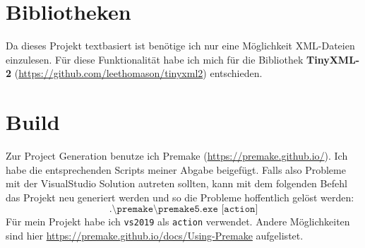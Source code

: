 \documentclass[a4paper,12pt]{article}
\begin{document}
\section*{Bibliotheken}

Da dieses Projekt textbasiert ist benötige ich nur eine Möglichkeit XML-Dateien einzulesen. Für diese Funktionalität habe ich mich für die Bibliothek \textbf{TinyXML-2} (\url{https://github.com/leethomason/tinyxml2}) entschieden.
 

\section*{Build}

Zur Project Generation benutze ich Premake (\url{https://premake.github.io/}). Ich habe die entsprechenden Scripts meiner Abgabe beigefügt.
Falls also Probleme mit der VisualStudio Solution autreten sollten,
kann mit dem folgenden Befehl das Projekt neu generiert werden und so die Probleme hoffentlich gelöst werden:
\[\texttt{.\textbackslash premake\textbackslash premake5.exe [action]}\]
Für mein Projekt habe ich \texttt{vs2019} als \texttt{action} verwendet. Andere Möglichkeiten sind hier \url{https://premake.github.io/docs/Using-Premake} aufgelistet.
\end{document}
